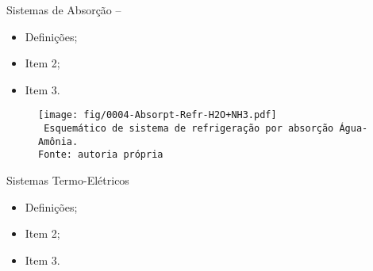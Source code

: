     \begin{frame}[allowframebreaks]{Sistemas de Absorção -- }\vspace*{-0em}
        \begin{itemize}
            \item<1-> Definições;
            \item<1-> Item 2;
            \item<1-> Item 3.
        \end{itemize}
    \end{frame}

    \begin{frame}\vspace*{-0em}
        \begin{center}
            \begin{figure}
                \fontsize{5.0}{5}\selectfont
                \texttt{[image: fig/0004-Absorpt-Refr-H2O+NH3.pdf]}
                \\\vspace*{-0.0em}\texttt{%
                    Esquemático de sistema de refrigeração por absorção Água-Amônia.\\
                    Fonte: autoria própria
                }
            \end{figure}
        \end{center}
    \end{frame}

    \begin{frame}{Sistemas Termo-Elétricos}\vspace*{-0em}
        \begin{itemize}
            \item<1-> Definições;
            \item<1-> Item 2;
            \item<1-> Item 3.
        \end{itemize}
    \end{frame}


